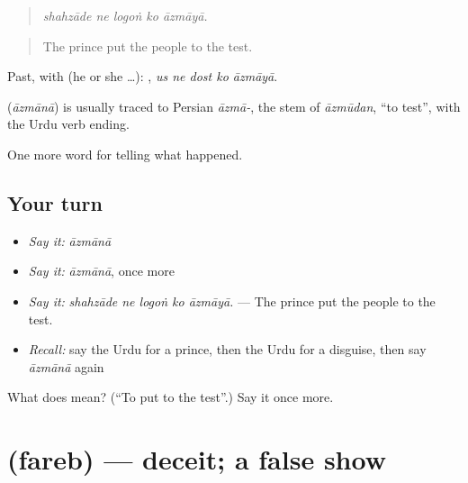 \begin{quote}
    
\end{quote}

\begin{quote}
\emph{shahzāde ne logoṅ ko āzmāyā.}
\end{quote}

\begin{quote}
The prince put the people to the test.
\end{quote}

Past, with  (he or she …):     , \emph{us ne dost ko āzmāyā}.

\begin{cousinweb}
\textbf{} (\emph{āzmānā}) is usually traced to Persian \emph{āzmā-}, the stem of \emph{āzmūdan}, \textquotedblleft{}to test\textquotedblright{}, with the Urdu verb ending.
\end{cousinweb}

\begin{grammarlens}[title={What you've built}]
One more word for telling what happened.
\end{grammarlens}

\subsection*{Your turn}
\begin{itemize}
\raggedright
  \item \emph{Say it:} \emph{āzmānā}
  \item \emph{Say it:} \emph{āzmānā}, once more
  \item \emph{Say it:} \emph{shahzāde ne logoṅ ko āzmāyā.} — The prince put the people to the test.
  \item \emph{Recall:} say the Urdu for a prince, then the Urdu for a disguise, then say \emph{āzmānā} again
\end{itemize}

\begin{tcolorbox}[breakable,colback=teal!4,colframe=teal!35!black,title={Before you move on}]
What does  mean? (\textquotedblleft{}To put to the test\textquotedblright{}.) Say it once more.
\end{tcolorbox}
\section[\texorpdfstring{\ur{فریب} (fareb)}{فریب (fareb)}]{ (fareb) — deceit; a false show}


